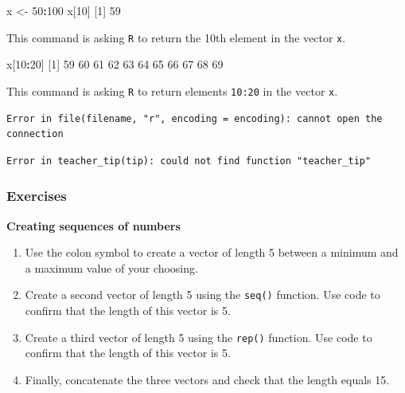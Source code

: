 \documentclass[
]{book}
\newenvironment{Shaded}{\begin{snugshade}}{\end{snugshade}}
\newcommand{\DecValTok}[1]{\textcolor[rgb]{0.00,0.00,0.81}{#1}}
\newcommand{\NormalTok}[1]{#1}
\newcommand{\OtherTok}[1]{\textcolor[rgb]{0.56,0.35,0.01}{#1}}
\newcommand{\SpecialCharTok}[1]{\textcolor[rgb]{0.81,0.36,0.00}{\textbf{#1}}}
\begin{document}
\begin{Shaded}
\begin{Highlighting}[]
\NormalTok{x }\OtherTok{\textless{}{-}} \DecValTok{50}\SpecialCharTok{:}\DecValTok{100}
\NormalTok{x[}\DecValTok{10}\NormalTok{]}
\NormalTok{[}\DecValTok{1}\NormalTok{] }\DecValTok{59}
\end{Highlighting}
\end{Shaded}

This command is asking \texttt{R} to return the 10th element in the vector \texttt{x}.

\begin{Shaded}
\begin{Highlighting}[]
\NormalTok{x[}\DecValTok{10}\SpecialCharTok{:}\DecValTok{20}\NormalTok{]}
\NormalTok{ [}\DecValTok{1}\NormalTok{] }\DecValTok{59} \DecValTok{60} \DecValTok{61} \DecValTok{62} \DecValTok{63} \DecValTok{64} \DecValTok{65} \DecValTok{66} \DecValTok{67} \DecValTok{68} \DecValTok{69}
\end{Highlighting}
\end{Shaded}

This command is asking \texttt{R} to return elements \texttt{10:20} in the vector \texttt{x}.

\begin{verbatim}
Error in file(filename, "r", encoding = encoding): cannot open the connection
\end{verbatim}

\begin{verbatim}
Error in teacher_tip(tip): could not find function "teacher_tip"
\end{verbatim}

\subsubsection*{Exercises}\label{exercises-3}

\textbf{Creating sequences of numbers}

\begin{enumerate}
\def\labelenumi{\arabic{enumi}.}
\item
  Use the colon symbol to create a vector of length 5 between a minimum and a maximum value of your choosing.
\item
  Create a second vector of length 5 using the \texttt{seq()} function. Use code to confirm that the length of this vector is 5.
\item
  Create a third vector of length 5 using the \texttt{rep()} function. Use code to confirm that the length of this vector is 5.
\item
  Finally, concatenate the three vectors and check that the length equals 15.
\end{enumerate}
\end{document}
